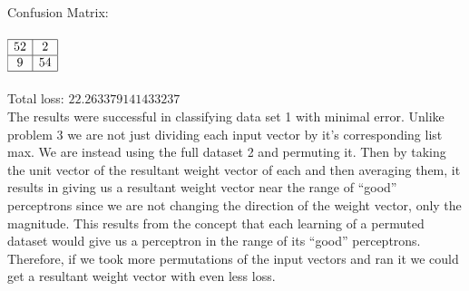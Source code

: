 \begin{enumerate}
\begin{enumerate}
					\textnormal{Confusion Matrix: } \\ \\
					
					\( 
						\begin{array}{|c|c|}
							\hline
							52 & 2 \\
							\hline							
							9 & 54 \\
							\hline
						\end{array}
					\) \\ \\

					Total loss: \(22.263379141433237\) \\
					
					\textnormal{The results were successful in classifying data set 1 with minimal error.  Unlike problem 3 we are not just dividing each input vector by it's corresponding list max. We are instead using the full dataset 2 and permuting it.  Then by taking the unit vector of the resultant weight vector of each and then averaging them, it results in giving us a resultant weight vector near the range of ``good'' perceptrons since we are not changing the direction of the weight vector, only the magnitude. This results from the concept that each learning of a permuted dataset would give us a perceptron in the range of its ``good'' perceptrons.  Therefore, if we took more permutations of the input vectors and ran it we could get a resultant weight vector with even less loss.}
			\end{enumerate}
\end{enumerate}


